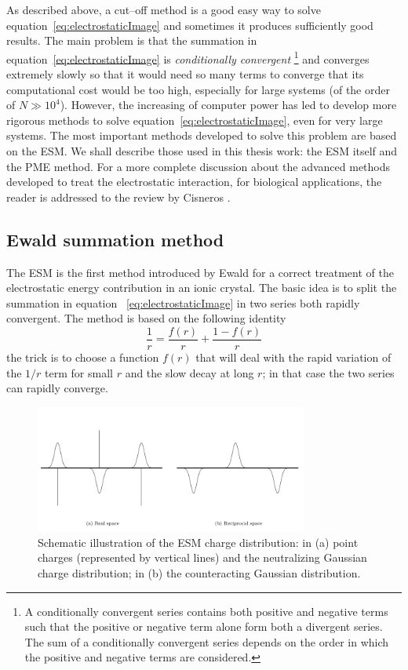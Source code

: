 As described above, a cut--off method is a good easy way to solve equation~\eqref{eq:electrostaticImage} and 
sometimes it produces sufficiently good results. The main problem is that the summation in 
equation~\eqref{eq:electrostaticImage} is \textit{conditionally convergent}
\footnote{A conditionally convergent series contains both positive and negative terms such that the positive or 
negative term alone form both a divergent series. The sum of a conditionally convergent series depends on the 
order in which the positive and negative terms are considered.} 
and converges extremely slowly so that it would need so many terms to converge that its computational cost would 
be too high, especially for large systems (of the order of $N \gg 10^4$). However, the increasing of computer power 
has led to develop more rigorous methods to solve equation~\eqref{eq:electrostaticImage}, even for very large 
systems. The most important methods developed to solve this problem are based on the \ac{ESM}. We shall describe 
those used in this thesis work: the \ac{ESM} itself and the \ac{PME} method. For a more complete discussion about 
the advanced methods developed to treat the electrostatic interaction, for biological applications, the reader is 
addressed to the review by Cisneros \etal \cite{Cisneros}.

\subsection{Ewald summation method} %
The \acf{ESM} is the first method introduced by Ewald for a correct treatment of the electrostatic energy
contribution in an ionic crystal. The basic idea is to split the summation in equation~
\eqref{eq:electrostaticImage} in two series both rapidly convergent. The method is based on the following identity
\begin{equation}
	\frac{1}{r} = \frac{f(r)}{r} + \frac{1 - f(r)}{r}
	\label{eq:ewaldTrick}
\end{equation}
the trick is to choose a function $f(r)$ that will deal with the rapid variation of the $1/r$ term for small $r$
and the slow decay at long $r$; in that case the two series can rapidly converge.
\begin{figure}[!ht]
	\centering
	\includegraphics[width=0.8\textwidth]{./img/EwaldSum/EwaldSum}
	\caption{Schematic illustration of the \acs{ESM} charge distribution: in (a) point charges (represented by vertical lines) and the neutralizing Gaussian charge distribution; in (b) the counteracting Gaussian distribution.}
	\label{fig:ewald}
\end{figure}

